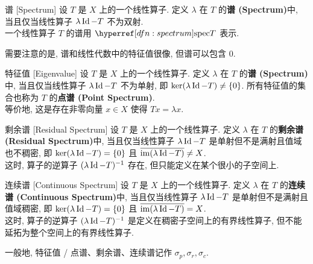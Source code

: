         \begin{dfn}
            [spectrum]
            {谱}
            [Spectrum]
            设 \(T\) 是 \(X\) 上的一个线性算子. 定义 \(\lambda\) 在 \(T\) 的\textbf{谱 (Spectrum)}中, 当且仅当线性算子 \(\lambda\operatorname{Id}-T\) 不为双射.\\
            一个线性算子 \(T\) 的谱用 \(\spec T\) 表示.
        \end{dfn}

        \begin{rmk}
            [Dedicatia]
            需要注意的是, 谱和线性代数中的特征值很像, 但谱可以包含 0.
        \end{rmk}

        \begin{dfn}
            {特征值}
            [Eigenvalue]
            设 \(T\) 是 \(X\) 上的一个线性算子. 定义 \(\lambda\) 在 \(T\) 的\textbf{谱 (Spectrum)}中, 当且仅当线性算子 \(\lambda\operatorname{Id}-T\) 不为单射, 即 \(\ker(\lambda\operatorname{Id}-T)\neq\{0\}\). 所有特征值的集合也称为 \(T\) 的\textbf{点谱 (Point Spectrum)}.\\
            等价地, 这是存在非零向量 \(x\in X\) 使得 \(Tx=\lambda x\).
        \end{dfn}

        \begin{dfn}
            {剩余谱}
            [Residual Spectrum]
            设 \(T\) 是 \(X\) 上的一个线性算子. 定义 \(\lambda\) 在 \(T\) 的\textbf{剩余谱 (Residual Spectrum)}中, 当且仅当线性算子 \(\lambda\operatorname{Id}-T\) 是单射但不是满射且值域也不稠密, 即 \(\ker(\lambda\operatorname{Id}-T)=\{0\}\) 且 \(\overline{\operatorname{im}(\lambda\operatorname{Id}-T)}\neq X\).\\
            这时, 算子的逆算子 \((\lambda\operatorname{Id}-T)^{-1}\) 存在, 但只能定义在某个很小的子空间上.
        \end{dfn}

        \begin{dfn}
            {连续谱}
            [Continuous Spectrum]
            设 \(T\) 是 \(X\) 上的一个线性算子. 定义 \(\lambda\) 在 \(T\) 的\textbf{连续谱 (Continuous Spectrum)}中, 当且仅当线性算子 \(\lambda\operatorname{Id}-T\) 是单射但不是满射且值域稠密, 即 \(\ker(\lambda\operatorname{Id}-T)=\{0\}\) 且 \(\overline{\operatorname{im}(\lambda\operatorname{Id}-T)}= X\).\\
            这时, 算子的逆算子 \((\lambda\operatorname{Id}-T)^{-1}\) 是定义在稠密子空间上的有界线性算子, 但不能延拓为整个空间上的有界线性算子.
        \end{dfn}

        \begin{rmk}
            一般地, 特征值 / 点谱、剩余谱、连续谱记作 \(\sigma_p, \sigma_r, \sigma_c\).
        \end{rmk}

